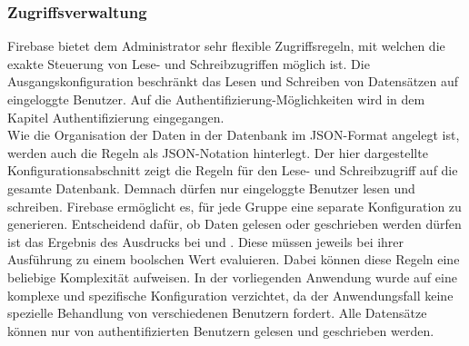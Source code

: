 \subsubsection{Zugriffsverwaltung}
Firebase bietet dem Administrator sehr flexible Zugriffsregeln, mit welchen die exakte Steuerung von Lese- und Schreibzugriffen möglich ist.
Die Ausgangskonfiguration beschränkt das Lesen und Schreiben von Datensätzen auf eingeloggte Benutzer. Auf die Authentifizierung-Möglichkeiten wird in dem Kapitel Authentifizierung eingegangen.\\
Wie die Organisation der Daten in der Datenbank im JSON-Format angelegt ist, werden auch die Regeln als JSON-Notation hinterlegt.
Der hier dargestellte Konfigurationsabschnitt zeigt die Regeln für den Lese- und Schreibzugriff auf die gesamte Datenbank. Demnach dürfen nur eingeloggte Benutzer lesen und schreiben. Firebase ermöglicht es, für jede Gruppe eine separate Konfiguration zu generieren.
Entscheidend dafür, ob Daten gelesen oder geschrieben werden dürfen ist das Ergebnis des Ausdrucks bei  und . Diese müssen jeweils bei ihrer Ausführung zu einem boolschen Wert evaluieren. Dabei können diese Regeln eine beliebige
Komplexität aufweisen.
In der vorliegenden Anwendung wurde auf eine komplexe und spezifische Konfiguration verzichtet, da der Anwendungsfall keine spezielle Behandlung von verschiedenen Benutzern fordert.
Alle Datensätze können nur von authentifizierten Benutzern gelesen und geschrieben werden.

